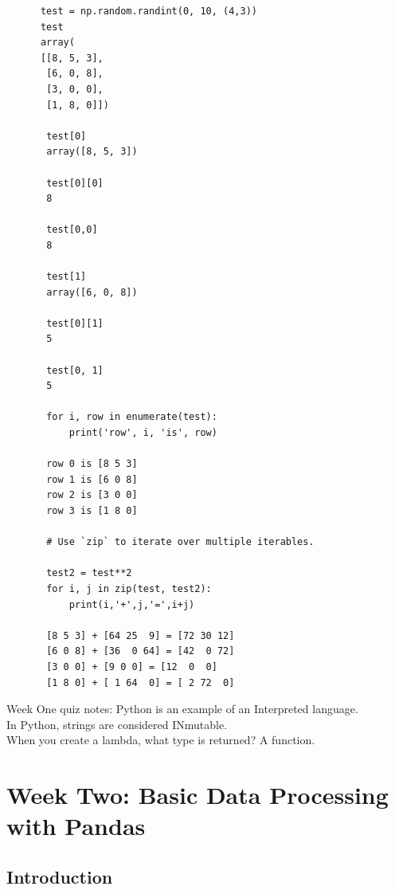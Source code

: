 \documentclass[11pt]{article}
\begin{document}
    \begin{lstlisting}
      test = np.random.randint(0, 10, (4,3))
      test
      array(
      [[8, 5, 3],
       [6, 0, 8],
       [3, 0, 0],
       [1, 8, 0]])

       test[0]
       array([8, 5, 3])

       test[0][0]
       8

       test[0,0]
       8

       test[1]
       array([6, 0, 8])

       test[0][1]
       5

       test[0, 1]
       5

       for i, row in enumerate(test):
           print('row', i, 'is', row)
           
       row 0 is [8 5 3]
       row 1 is [6 0 8]
       row 2 is [3 0 0]
       row 3 is [1 8 0]

       # Use `zip` to iterate over multiple iterables.

       test2 = test**2
       for i, j in zip(test, test2):
           print(i,'+',j,'=',i+j)
       
       [8 5 3] + [64 25  9] = [72 30 12]
       [6 0 8] + [36  0 64] = [42  0 72]
       [3 0 0] + [9 0 0] = [12  0  0]
       [1 8 0] + [ 1 64  0] = [ 2 72  0]
    \end{lstlisting}

Week One quiz notes:
Python is an example of an Interpreted language. \\
In Python, strings are considered INmutable.\\
When you create a lambda, what type is returned? A function.\\







\newpage
\section{Week Two: Basic Data Processing with Pandas}

    \subsection{Introduction}
\end{document}
